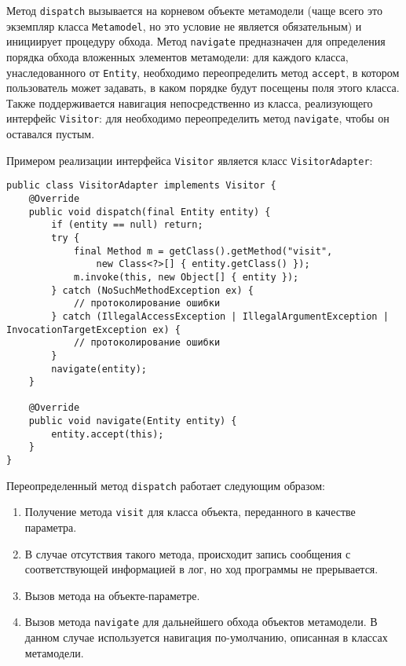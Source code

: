 Метод \texttt{dispatch} вызывается на корневом объекте метамодели (чаще всего
это экземпляр класса \texttt{Metamodel}, но это условие не является
обязательным) и инициирует процедуру обхода. Метод \texttt{navigate}
предназначен для определения порядка обхода вложенных элементов метамодели: для
каждого класса, унаследованного от \texttt{Entity}, необходимо переопределить
метод \texttt{accept}, в котором пользователь может задавать, в каком порядке
будут посещены поля этого класса. Также поддерживается навигация
непосредственно из класса, реализующего интерфейс \texttt{Visitor}: для
необходимо переопределить метод \texttt{navigate}, чтобы он оставался пустым.

Примером реализации интерфейса \texttt{Visitor} является класс
\texttt{VisitorAdapter}:

\begin{lstlisting}[caption={Реализация интерфейса Visitor}]
public class VisitorAdapter implements Visitor {
    @Override
    public void dispatch(final Entity entity) {
        if (entity == null) return;
        try {
            final Method m = getClass().getMethod("visit",
                new Class<?>[] { entity.getClass() });
            m.invoke(this, new Object[] { entity });
        } catch (NoSuchMethodException ex) {
            // протоколирование ошибки
        } catch (IllegalAccessException | IllegalArgumentException | InvocationTargetException ex) {
            // протоколирование ошибки
        }
        navigate(entity);
    }

    @Override
    public void navigate(Entity entity) {
        entity.accept(this);
    }
}
\end{lstlisting}

Переопределенный метод \texttt{dispatch} работает следующим образом:

\begin{enumerate}
    \item Получение метода \texttt{visit} для класса объекта, переданного
    в качестве параметра.
    \item В случае отсутствия такого метода, происходит запись сообщения с
    соответствующей информацией в лог, но ход программы не прерывается.
    \item Вызов метода на объекте-параметре.
    \item Вызов метода \texttt{navigate} для дальнейшего обхода объектов
    метамодели. В данном случае используется навигация по-умолчанию, описанная
    в классах метамодели.
\end{enumerate}

